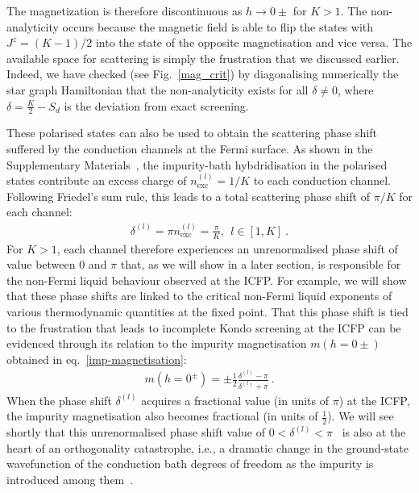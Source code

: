 \documentclass{iopart}
\begin{document}
The magnetization is therefore discontinuous as \(h\to 0\pm\) for \(K>1\). The non-analyticity occurs because the magnetic field is able to flip the states with \(J^z= (K-1)/2\) into the state of the opposite magnetisation and vice versa. The available space for scattering is simply the frustration that we discussed earlier. Indeed, we have checked (see Fig.~\ref{mag_crit}) by diagonalising numerically the star graph Hamiltonian that the non-analyticity exists for all \(\delta \neq 0\), where \(\delta = \frac{K}{2} - S_{d}\) is the deviation from exact screening. 

These polarised states can also be used to obtain the scattering phase shift suffered by the conduction channels at the Fermi surface. As shown in the Supplementary Materials~\cite{SM}, the impurity-bath hybdridisation in the polarised states contribute an excess charge of \(n_\mathrm{exc}^{(l)} = 1/K\) to each conduction channel. Following Friedel's sum rule, this leads to a total scattering phase shift of \(\pi/K\) for each channel:
\begin{eqnarray}\label{phase-stargraph}
	\delta^{(l)} = \pi n_\mathrm{exc}^{(l)} = \frac{\pi}{K}, ~ ~ l \in \left[1, K\right] ~.
\end{eqnarray}
For \(K > 1\), each channel therefore experiences an unrenormalised phase shift of value between \(0\) and \(\pi\) that, as we will show in a later section, is responsible for the non-Fermi liquid behaviour observed at the ICFP. For example, we will show that these phase shifts are linked to the critical non-Fermi liquid exponents of various thermodynamic quantities at the fixed point. That this phase shift is tied to the frustration that leads to incomplete Kondo screening at the ICFP can be evidenced 
through its relation to the impurity magnetisation \(m (h=0\pm)\) obtained in eq.~\ref{imp-magnetisation}:
\begin{eqnarray}\label{magnetisation-phase}
	m(h=0^\pm) = \pm \frac{1}{2} \frac{\delta^{(l)} - \pi}{\delta^{(l)} + \pi}~.
\end{eqnarray}
When the phase shift \(\delta^{(l)}\) acquires a fractional value (in units of \(\pi\)) at the ICFP, the impurity magnetisation also becomes fractional (in units of \(\frac{1}{2}\)). We will see shortly that this unrenormalised phase shift value of \(0 < \delta^{(l)} < \pi\)~\cite{anderson_1990} is also at the heart of 
an orthogonality catastrophe, i.e., a dramatic change in the ground-state wavefunction of the conduction bath degrees of freedom as the impurity is introduced among them~\cite{anderson1967infrared,varma2002singular}.
\end{document}
